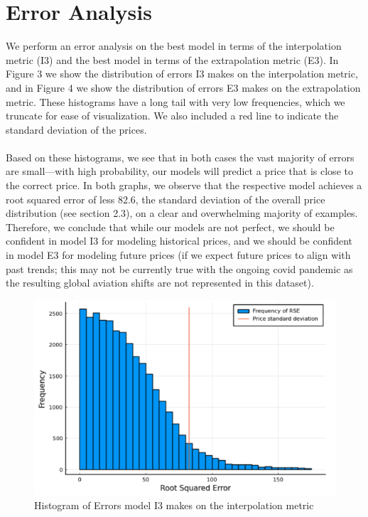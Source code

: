 \documentclass{article}
\begin{document}
\section{Error Analysis}
We perform an error analysis on the best model in terms of the interpolation metric (I3) and the best model in terms of the extrapolation metric (E3). In Figure 3 we show the distribution of errors I3 makes on the interpolation metric, and in Figure 4 we show the distribution of errors E3 makes on the extrapolation metric. These histograms have a long tail with very low frequencies, which we truncate for ease of visualization. We also included a red line to indicate the standard deviation of the prices.\\\\
Based on these histograms, we see that in both cases the vast majority of errors are small—with high probability, our models will predict a price that is close to the correct price. In both graphs, we observe that the respective model achieves a root squared error of less 82.6, the standard deviation of the overall price distribution (see section 2.3), on a clear and overwhelming majority of examples. Therefore, we conclude that while our models are not perfect, we should be confident in model I3 for modeling historical prices, and we should be confident in model E3 for modeling future prices (if we expect future prices to align with past trends; this may not be currently true with the ongoing covid pandemic as the resulting global aviation shifts are not represented in this dataset).   

\begin{figure}[h]
\centering
\includegraphics[scale=.40]{images/I3_Ierrors.png}
\caption{Histogram of Errors model I3 makes on the interpolation metric}
\end{figure}
\end{document}
